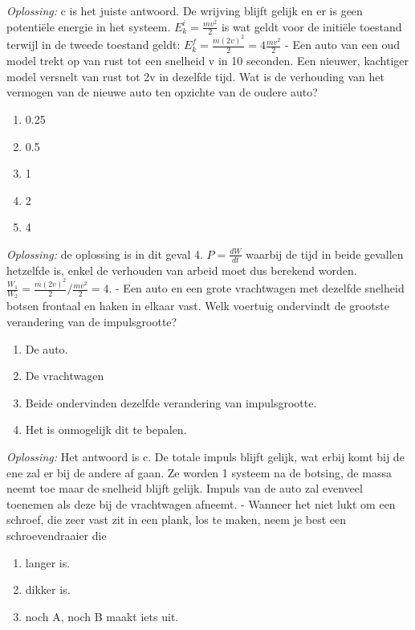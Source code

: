 \documentclass[12pt,a4paper]{article}
\begin{document}
	\textit{Oplossing:} c is het juiste antwoord. De wrijving blijft gelijk en er is geen potentiële energie in het systeem. \(E_k^i = \frac{mv^2}{2}\) is wat geldt voor de initiële toestand terwijl in de tweede toestand geldt: \(E_k^f = \frac{m(2v)^2}{2} = 4\frac{mv^2}{2}\)
	\newline
	- Een auto van een oud model trekt op van rust tot een snelheid v in 10 seconden. Een nieuwer, kachtiger model versnelt van rust tot 2v in dezelfde tijd. Wat is de verhouding van het vermogen van de nieuwe auto ten opzichte van de oudere auto? 
	\begin{enumerate}[label=\alph*]
		\item 0.25
		\item 0.5
		\item 1
		\item 2
		\item 4
	\end{enumerate}
	\textit{Oplossing:} de oplossing is in dit geval 4. \(P = \frac{dW}{dt}\) waarbij de tijd in beide gevallen hetzelfde is, enkel de verhouden van arbeid moet dus berekend worden. \(\frac{W_1}{W_2} = \frac{m(2v)^2}{2} / \frac{mv^2}{2} = 4\).
	\newline 
	- Een auto en een grote vrachtwagen met dezelfde snelheid botsen frontaal en haken in elkaar vast. Welk voertuig ondervindt de grootste verandering van de impulsgrootte?
	\begin{enumerate}[label=\alph*]
		\item De auto.
		\item De vrachtwagen
		\item Beide ondervinden dezelfde verandering van impulsgrootte.
		\item Het is onmogelijk dit te bepalen. 
	\end{enumerate}
	\textit{Oplossing:} Het antwoord is c. De totale impuls blijft gelijk, wat erbij komt bij de ene zal er bij de andere af gaan. Ze worden 1 systeem na de botsing, de massa neemt toe maar de snelheid blijft gelijk. Impuls van de auto zal evenveel toenemen als deze bij de vrachtwagen afneemt. 
	\newline
	- Wanneer het niet lukt om een schroef, die zeer vast zit in een plank, los te maken, neem je best een schroevendraaier die
	\begin{enumerate}[label=\alph*]
		\item langer is.
		\item dikker is.
		\item noch A, noch B maakt iets uit.
	\end{enumerate}
\end{document}
